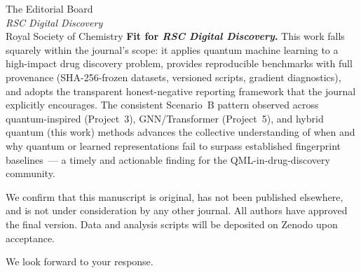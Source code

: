 \documentclass[11pt,a4paper]{letter}
\begin{document}
\begin{letter}{The Editorial Board\\
  \textit{RSC Digital Discovery}\\
  Royal Society of Chemistry}
\textbf{Fit for \textit{RSC Digital Discovery}.}
This work falls squarely within the journal's scope: it applies quantum machine
learning to a high-impact drug discovery problem, provides reproducible
benchmarks with full provenance (SHA-256-frozen datasets, versioned scripts,
gradient diagnostics), and adopts the transparent honest-negative reporting
framework that the journal explicitly encourages. The consistent
Scenario~B pattern observed across quantum-inspired (Project~3),
GNN/Transformer (Project~5), and hybrid quantum (this work) methods advances
the collective understanding of when and why quantum or learned representations
fail to surpass established fingerprint baselines~--- a timely and actionable
finding for the QML-in-drug-discovery community.

We confirm that this manuscript is original, has not been published elsewhere,
and is not under consideration by any other journal. All authors have approved
the final version. Data and analysis scripts will be deposited on Zenodo upon
acceptance.

\closing{We look forward to your response.}

\end{letter}
\end{document}
